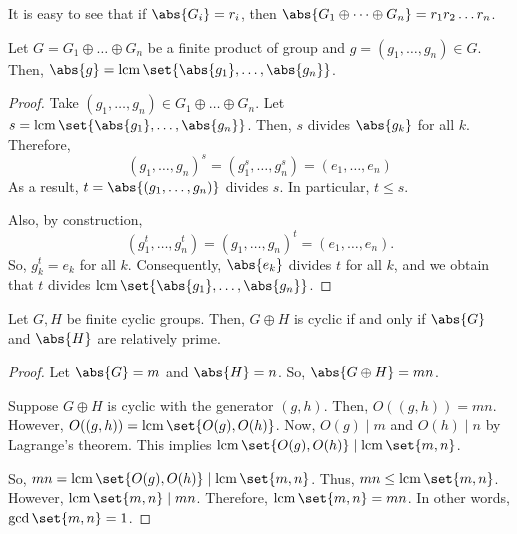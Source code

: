 \documentclass[11pt]{penrose}
\begin{document}
\begin{remark}
    It is easy to see that if $\abs{G_{i}} = r_{i}$, then $\abs{ G_{1} \oplus \dots \oplus G_{n} } = r_{1} r_{2} \dots r_{n}$.
\end{remark}

\begin{nthm}
    Let $G = G_{1} \oplus \dots \oplus G_{n}$ be a finite product of group and $g = (g_{1}, \dots, g_{n}) \in G$. Then, $\abs{g} = \lcm \set{\abs{g_{1}}, \dots, \abs{g_{n}}}$.
\end{nthm}
\begin{proof}
    Take $(g_{1}, \dots, g_{n}) \in G_{1} \oplus \dots \oplus G_{n}$. Let $s = \lcm \set{\abs{g_{1}}, \dots, \abs{g_{n}}}$. Then, $s$ divides $\abs{g_{k}}$ for all $k$. Therefore,
    \begin{equation*}
        (g_{1}, \dots, g_{n})^{s}
        = (g_{1}^{s}, \dots, g_{n}^{s})
        = (e_{1}, \dots, e_{n})
    \end{equation*}
    As a result, $t = \abs{(g_{1}, \dots, g_{n})}$ divides $s$. In particular, $t \leq s$.

    Also, by construction,
    \begin{equation*}
        (g_{1}^{t}, \dots, g_{n}^{t})
        = (g_{1}, \dots, g_{n})^{t}
        = (e_{1}, \dots, e_{n}).
    \end{equation*}
    So, $g_{k}^{t} = e_{k}$ for all $k$. Consequently, $\abs{e_{k}}$ divides $t$ for all $k$, and we obtain that $t$ divides $\lcm \set{\abs{g_{1}}, \dots, \abs{g_{n}}}$.
\end{proof}

\begin{nthm}
    Let $G, H$ be finite cyclic groups. Then, $G \oplus H$ is cyclic if and only if $\abs{G}$ and $\abs{H}$ are relatively prime.
\end{nthm}
\begin{proof}
    Let $\abs{G} = m$ and $\abs{H} = n$. So, $\abs{G \oplus H} = mn$.

    Suppose $G \oplus H$ is cyclic with the generator $(g,h)$. Then, $O((g,h)) = mn$. However, $O((g,h)) = \lcm\set{O(g), O(h)}$. Now, $O(g) \mid m$ and $O(h) \mid n$ by Lagrange's theorem. This implies $\lcm\set{O(g), O(h)} \mid \lcm\set{m,n}$.

    So, $mn = \lcm\set{O(g), O(h)} \mid \lcm\set{m,n}$. Thus, $mn \leq \lcm\set{m,n}$. However, $\lcm\set{m,n} \mid mn$. Therefore, $\lcm\set{m,n} = mn$. In other words, $\gcd\set{m,n} = 1$.
\end{proof}
\end{document}
